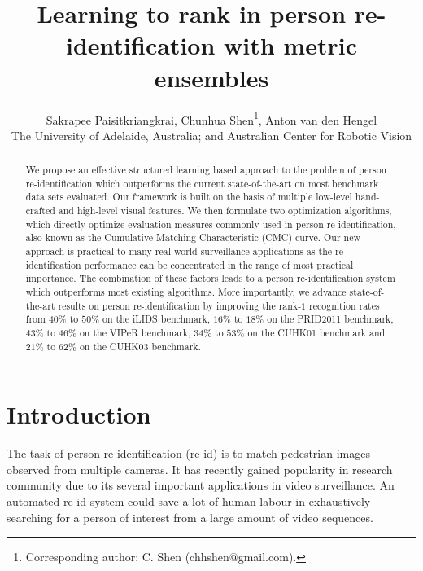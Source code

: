 \documentclass[10pt,twocolumn,letterpaper]{article}
\begin{document}
%
\title{Learning to rank in person re-identification with metric ensembles}


\author{
         Sakrapee Paisitkriangkrai,
         Chunhua Shen\thanks{Corresponding author: C. Shen (chhshen@gmail.com).},
         Anton van den Hengel
         \\
         The University of Adelaide, Australia; and Australian Center for Robotic Vision
}


\maketitle


\begin{abstract}



We propose an effective structured learning based approach
to the problem of person re-identification
which outperforms the current state-of-the-art on most benchmark data sets evaluated.
Our framework is built on the basis of multiple low-level hand-crafted
and high-level visual features.
%
%
We then formulate two optimization algorithms,
which directly optimize
evaluation measures commonly used in person re-identification, also known as
the Cumulative Matching Characteristic (CMC) curve.
Our new approach is practical to many real-world surveillance applications
as the re-identification performance can be concentrated in the range of most
practical importance.
The combination of these factors leads to a person re-identification system
which outperforms most existing algorithms.
More importantly, we advance state-of-the-art results on person re-identification
by improving the rank-$1$ recognition rates from $40\%$ to $50\%$ on the
iLIDS benchmark, $16\%$ to $18\%$ on the PRID2011 benchmark,
$43\%$ to $46\%$ on the VIPeR benchmark, $34\%$ to $53\%$ on the
CUHK01 benchmark and $21\%$ to $62\%$ on the CUHK03 benchmark.




\end{abstract}



\tableofcontents


\section{Introduction}

The task of person re-identification (re-id) is to match pedestrian images
observed from multiple cameras.
It has recently gained popularity in research community due to its
several important applications in video surveillance.
An automated re-id system could save a lot of human labour in
exhaustively searching for a person of interest from
a large amount of video sequences.
\end{document}
